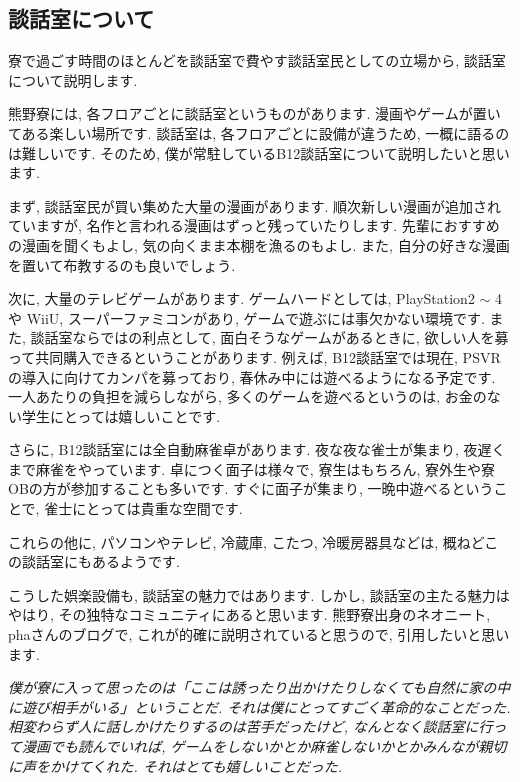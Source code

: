 \documentclass[10pt,b5jsbook,dvips,dvipdfmx,openany]{jsbook}
\theoremstyle{definition}
\begin{document}

		\subsection{談話室について}

		寮で過ごす時間のほとんどを談話室で費やす談話室民としての立場から, 談話室について説明します.

		熊野寮には, 各フロアごとに談話室というものがあります. 漫画やゲームが置いてある楽しい場所です. 談話室は, 各フロアごとに設備が違うため, 一概に語るのは難しいです. そのため, 僕が常駐しているB12談話室について説明したいと思います.

		まず, 談話室民が買い集めた大量の漫画があります. 順次新しい漫画が追加されていますが, 名作と言われる漫画はずっと残っていたりします. 先輩におすすめの漫画を聞くもよし, 気の向くまま本棚を漁るのもよし. また, 自分の好きな漫画を置いて布教するのも良いでしょう.

		次に, 大量のテレビゲームがあります. ゲームハードとしては, PlayStation2 $ \sim $ 4や WiiU, スーパーファミコンがあり, ゲームで遊ぶには事欠かない環境です. また, 談話室ならではの利点として, 面白そうなゲームがあるときに, 欲しい人を募って共同購入できるということがあります. 例えば, B12談話室では現在, PSVRの導入に向けてカンパを募っており, 春休み中には遊べるようになる予定です. 一人あたりの負担を減らしながら, 多くのゲームを遊べるというのは, お金のない学生にとっては嬉しいことです.

		さらに, B12談話室には全自動麻雀卓があります. 夜な夜な雀士が集まり, 夜遅くまで麻雀をやっています. 卓につく面子は様々で, 寮生はもちろん, 寮外生や寮OBの方が参加することも多いです. すぐに面子が集まり, 一晩中遊べるということで, 雀士にとっては貴重な空間です.

		これらの他に, パソコンやテレビ, 冷蔵庫, こたつ, 冷暖房器具などは, 概ねどこの談話室にもあるようです.

		こうした娯楽設備も, 談話室の魅力ではあります. しかし, 談話室の主たる魅力はやはり, その独特なコミュニティにあると思います. 熊野寮出身のネオニート, phaさんのブログで, これが的確に説明されていると思うので, 引用したいと思います.

		\emph{僕が寮に入って思ったのは「ここは誘ったり出かけたりしなくても自然に家の中に遊び相手がいる」ということだ. それは僕にとってすごく革命的なことだった. 相変わらず人に話しかけたりするのは苦手だったけど, なんとなく談話室に行って漫画でも読んでいれば, ゲームをしないかとか麻雀しないかとかみんなが親切に声をかけてくれた. それはとても嬉しいことだった. }
\end{document}
